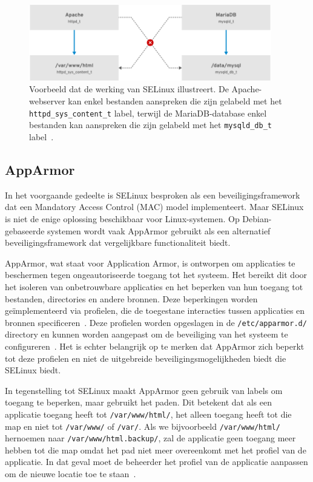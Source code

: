 \begin{figure}[h!]
    \begin{center}
        \includegraphics[width=300pt]
        {./graphics/linux/selinux-example.png}
        \caption[Voorbeeld van SELinux werking.]{\label{fig:sleinux-example}Voorbeeld dat de werking van SELinux illustreert. De Apache-webserver kan enkel bestanden aanspreken die zijn gelabeld met het \texttt{httpd\_sys\_content\_t} label, terwijl de MariaDB-database enkel bestanden kan aanspreken die zijn gelabeld met het \texttt{mysqld\_db\_t} label~\autocite{selinux-rhel8}.}
    \end{center}
\end{figure}

\subsection{AppArmor}
\label{linux_apparmor}

In het voorgaande gedeelte is SELinux besproken als een beveiligingsframework dat een Mandatory Access Control (MAC) model implementeert.
Maar SELinux is niet de enige oplossing beschikbaar voor Linux-systemen.
Op Debian-gebaseerde systemen wordt vaak AppArmor gebruikt als een alternatief beveiligingsframework dat vergelijkbare functionaliteit biedt.

AppArmor, wat staat voor Application Armor, is ontworpen om applicaties te beschermen tegen ongeautoriseerde toegang tot het systeem.
Het bereikt dit door het isoleren van onbetrouwbare applicaties en het beperken van hun toegang tot bestanden, directories en andere bronnen.
Deze beperkingen worden ge\"implementeerd via profielen, die de toegestane interacties tussen applicaties en bronnen specificeren~\autocite{gruenbacher2007apparmor}.
Deze profielen worden opgeslagen in de \texttt{/etc/apparmor.d/} directory en kunnen worden aangepast om de beveiliging van het systeem te configureren~\autocite{apparmor-ubuntu}.
Het is echter belangrijk op te merken dat AppArmor zich beperkt tot deze profielen en niet de uitgebreide beveiligingsmogelijkheden biedt die SELinux biedt.

In tegenstelling tot SELinux maakt AppArmor geen gebruik van labels om toegang te beperken, maar gebruikt het paden.
Dit betekent dat als een applicatie toegang heeft tot \texttt{/var/www/html/}, het alleen toegang heeft tot die map en niet tot \texttt{/var/www/} of \texttt{/var/}.
Als we bijvoorbeeld \texttt{/var/www/html/} hernoemen naar \texttt{/var/www/html.backup/}, zal de applicatie geen toegang meer hebben tot die map omdat het pad niet meer overeenkomt met het profiel van de applicatie.
In dat geval moet de beheerder het profiel van de applicatie aanpassen om de nieuwe locatie toe te staan~\autocite{gruenbacher2007apparmor}.
